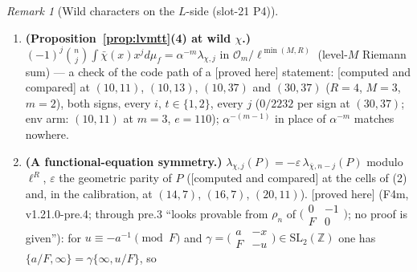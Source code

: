 \documentclass[11pt]{article}
\theoremstyle{remark}
\newtheorem{remark}[theorem]{Remark}
\newcommand{\F}{\mathbb{F}}
\newcommand{\Z}{\mathbb{Z}}
\newcommand{\PROVED}{\textsf{[proved here]}}
\newcommand{\CMPD}{\textsf{[computed and compared]}}   %
\begin{document}
\begin{remark}[Wild characters on the $L$-side (slot-21 P4)]
\begin{enumerate}
  and $\bigl(\begin{smallmatrix}1&v/M\\0&1\end{smallmatrix}\bigr)W_{M^{2}}=\gamma_v\bigl(\begin{smallmatrix}M&u\\0&M\end{smallmatrix}\bigr)$ with $\gamma_v=\bigl(\begin{smallmatrix}v&-x\\M&-u\end{smallmatrix}\bigr)\in\mathrm{SL}_2(\Z)$,
  $u\equiv-v^{-1}\pmod M$, $W_{M^{2}}=\bigl(\begin{smallmatrix}0&-1\\M^{2}&0\end{smallmatrix}\bigr)$; as $f|_k\gamma_v=f$ and $v\mapsto u$ permutes $(\Z/M)^{\times}$ with $\bar\chi(v)=\chi(-1)\chi(u)$,
  $f_\chi|_kW_{M^{2}}=\chi(-1)\,\tau(\chi)\tau(\bar\chi)^{-1}f_{\bar\chi}=(\tau(\chi)^{2}/M)\,f_{\bar\chi}$ by $\tau(\bar\chi)=\chi(-1)\overline{\tau(\chi)}$ and $|\tau(\chi)|^{2}=M$, and the Mellin
  transform turns $f_\chi|_kW_{M^{2}}=w\,f_{\bar\chi}$ into the displayed functional equation; \CMPD{} to $10^{-59}$; P4's v0.1 predicted $\chi(-1)\tau(\chi)^{2}/M$ from a sign-blind
  calibration, and the C++ gate refuted it --- \texttt{P4\_spec.md}~\S8, deviation~1; the constant of Proposition~\ref{prop:lvmtt} does not use $w$).
\item \textbf{(Proposition~\ref{prop:lvmtt}(4) at wild $\chi$.)} $(-1)^{j}\binom nj\int\bar\chi(x)x^{j}d\mu_f=\alpha^{-m}\lambda_{\chi,j}$ in $\mathcal O_m/\ell^{\min(M,R)}$ (level-$M$ Riemann sum) --- a
  check of the code path of a \PROVED{} statement: \CMPD{} at $(10,11)$, $(10,13)$, $(10,37)$ and $(30,37)$ ($R=4$, $M=3$, $m=2$), both signs, every $i$, $t\in\{1,2\}$, every $j$ ($0/2232$ per sign at
  $(30,37)$; env arm: $(10,11)$ at $m=3$, $e=110$); $\alpha^{-(m-1)}$ in place of $\alpha^{-m}$ matches nowhere.
\item \textbf{(A functional-equation symmetry.)} $\lambda_{\chi,j}(P)=-\varepsilon\,\lambda_{\bar\chi,n-j}(P)$ modulo $\ell^{R}$, $\varepsilon$ the geometric parity of $P$ (\CMPD{} at the cells of (2) and, in the
  calibration, at $(14,7)$, $(16,7)$, $(20,11)$). \PROVED{} (F4m, v1.21.0-pre.4; through pre.3 ``looks provable from $\rho_n$ of $\bigl(\begin{smallmatrix}0&-1\\F&0\end{smallmatrix}\bigr)$; no proof is given''): for
  $u\equiv-a^{-1}\pmod F$ and $\gamma=\bigl(\begin{smallmatrix}a&-x\\F&-u\end{smallmatrix}\bigr)\in\mathrm{SL}_2(\Z)$ one has $\{a/F,\infty\}=\gamma\{\infty,u/F\}$, so

\end{enumerate}
\end{remark}
\end{document}
